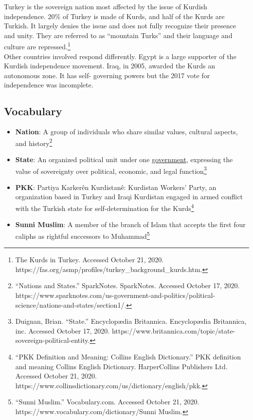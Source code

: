 \documentclass[10pt, letterpaper]{article}
\begin{document}
Turkey is the sovereign nation most affected by the issue of Kurdish
independence. 20\% of Turkey is made of Kurds, and half of the Kurds are
Turkish. It largely denies the issue and does not fully recognize their
presence and unity. They are referred to as ``mountain Turks'' and their
language and culture are repressed.\footnote{The Kurds in Turkey.
  Accessed October 21, 2020.
  https://fas.org/asmp/profiles/turkey\_background\_kurds.htm.} \\

Other countries involved respond differently. Egypt is a large supporter
of the Kurdish independence movement. Iraq, in 2005, awarded the Kurds
an autonomous zone. It has self- governing powers but the 2017 vote for
independence was incomplete. \\

\subsection{Vocabulary}

\begin{itemize}
    \item 
\textbf{Nation}: A group of individuals who share similar values,
cultural aspects, and history\footnote{``Nations and States.''
  SparkNotes. SparkNotes. Accessed October 17, 2020.
  https://www.sparknotes.com/us-government-and-politics/political-science/nations-and-states/section1/.}
    \item 
\textbf{State}: An organized political unit under one
\href{https://en.wikipedia.org/wiki/Government}{government}, expressing
the value of sovereignty over political, economic, and legal
function\footnote{Duignan, Brian. ``State.'' Encyclopædia Britannica.
  Encyclopædia Britannica, inc. Accessed October 17, 2020.
  https://www.britannica.com/topic/state-sovereign-political-entity.}
    \item 
\textbf{PKK}: Partiya Karkerên Kurdistanê: Kurdistan Workers' Party, an
organization based in Turkey and Iraqi Kurdistan engaged in armed
conflict with the Turkish state for self-determination for the
Kurds\footnote{``PKK Definition and Meaning: Collins English
  Dictionary.'' PKK definition and meaning \textbar{} Collins English
  Dictionary. HarperCollins Publishers Ltd. Accessed October 21, 2020.
  https://www.collinsdictionary.com/us/dictionary/english/pkk.}
    \item 
\textbf{Sunni Muslim}: A member of the branch of Islam that accepts the
first four caliphs as rightful successors to Muhammad\footnote{``Sunni
  Muslim.'' Vocabulary.com. Accessed October 21, 2020.
  https://www.vocabulary.com/dictionary/Sunni Muslim.}
\end{itemize}
\end{document}
